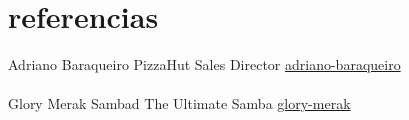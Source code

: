 \documentclass[a4paper]{myfriggeri-cv}
\begin{document}






\section{referencias}
\begin{entrylist}
\entry
{}
{Adriano Baraqueiro}
{PizzaHut Sales Director}
{\href{https://br.linkedin.com/in/adriano-baraqueiro-57955b5}{adriano-baraqueiro}}
{}{}
\\
\\
\entry
{}
{Glory Merak Sambad}
{The Ultimate Samba}
{\href{https://br.linkedin.com/in/glorymerak}{glory-merak}}
{}{}

\end{entrylist}

\end{document}
